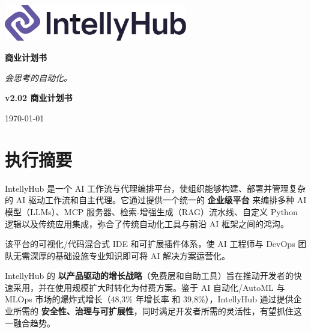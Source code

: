 \documentclass[11pt, a4paper, oneside]{article}
\begin{document}
\thispagestyle{empty} 
\begin{titlepage}
    \centering
    \vspace{1cm}
    
    \includegraphics[width=0.6\textwidth]{IntellyHub_Logo_Colored.png}
    
    \vspace{2.5cm}
    
    {\Huge\bfseries\color{PrimaryColor}商业计划书}
    
    \vspace{1.5cm}
    
    {\Large\itshape\lightfont 会思考的自动化。}
    
    \vfill %
    
    {\large\bfseries\color{PrimaryColor}v2.02 \color{SecondaryColor}商业计划书}
    
    \vspace{0.5cm}
    
    {\large \today}
    
\end{titlepage}

\tableofcontents
\newpage


\section{执行摘要}
IntellyHub 是一个 AI 工作流与代理编排平台，使组织能够构建、部署并管理复杂的 AI 驱动工作流和自主代理。它通过提供一个统一的 \textbf{企业级平台} 来编排多种 AI 模型（LLMs）、MCP 服务器、检索-增\-强\-生成（RAG）流水线、自定义 Python 逻辑以及传统应用集成，弥合了传统自动化工具与前沿 AI 框架之间的鸿沟。 

该平台的可视化/代码混合式 IDE 和可扩展插件体系，使 AI 工程师与 DevOps 团队无需深厚的基础设施专业知识即可将 AI 解决方案运营化。 

IntellyHub 的 \textbf{以产品驱动的增长战略}（免费层和自助工具）旨在推动开发者的快速采用，并在使用规模扩大时转化为付费方案。鉴于 AI 自动化/AutoML 与 MLOps 市场的爆炸式增长（48,3\% 年增长率\cite{AIMarket} 和 39,8\%\cite{MLOpsMarket}），IntellyHub 通过提供企业所需的 \textbf{安全性、治理与可扩展性}，同时满足开发者所需的灵活性，有望抓住这一融合趋势。
\end{document}
